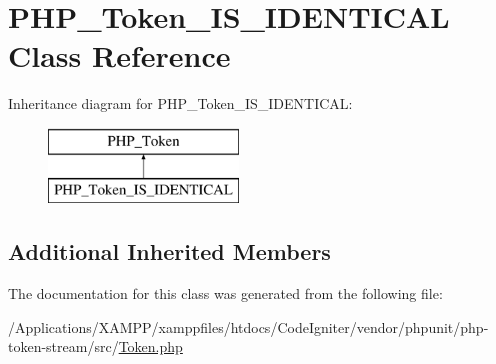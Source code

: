 \hypertarget{class_p_h_p___token___i_s___i_d_e_n_t_i_c_a_l}{}\section{P\+H\+P\+\_\+\+Token\+\_\+\+I\+S\+\_\+\+I\+D\+E\+N\+T\+I\+C\+AL Class Reference}
\label{class_p_h_p___token___i_s___i_d_e_n_t_i_c_a_l}
Inheritance diagram for P\+H\+P\+\_\+\+Token\+\_\+\+I\+S\+\_\+\+I\+D\+E\+N\+T\+I\+C\+AL\+:\begin{figure}[H]
\begin{center}
\leavevmode
\includegraphics[height=2.000000cm]{class_p_h_p___token___i_s___i_d_e_n_t_i_c_a_l}
\end{center}
\end{figure}
\subsection*{Additional Inherited Members}


The documentation for this class was generated from the following file\+:\begin{DoxyCompactItemize}
\item 
/\+Applications/\+X\+A\+M\+P\+P/xamppfiles/htdocs/\+Code\+Igniter/vendor/phpunit/php-\/token-\/stream/src/\mbox{\hyperlink{_token_8php}{Token.\+php}}\end{DoxyCompactItemize}
